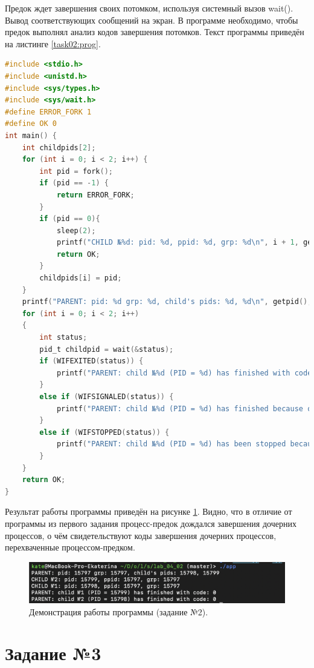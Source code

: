\documentclass[12pt]{report}
\begin{document}
Предок ждет завершения своих потомком, используя системный вызов wait(). Вывод соответствующих сообщений на экран. В программе необходимо, чтобы предок выполнял анализ кодов завершения потомков. Текст программы приведён на листинге \ref{task02:prog}.

\begin{lstlisting}[label=task02:prog,caption=Системный вызов wait(),language=C]
#include <stdio.h>
#include <unistd.h>
#include <sys/types.h>
#include <sys/wait.h>
#define ERROR_FORK 1
#define OK 0
int main() {
    int childpids[2];
    for (int i = 0; i < 2; i++) {
        int pid = fork();
        if (pid == -1) {
            return ERROR_FORK;
        }
        if (pid == 0){
            sleep(2);
            printf("CHILD №%d: pid: %d, ppid: %d, grp: %d\n", i + 1, getpid(), getppid(), getpgrp());
            return OK;
        }
        childpids[i] = pid;
    }
    printf("PARENT: pid: %d grp: %d, child's pids: %d, %d\n", getpid(), getpgrp(), childpids[0], childpids[1]);
    for (int i = 0; i < 2; i++)
    {
        int status;
        pid_t childpid = wait(&status);
        if (WIFEXITED(status)) {
            printf("PARENT: child №%d (PID = %d) has finished with code: %d\n", i + 1, childpid, WEXITSTATUS(status));
        }
        else if (WIFSIGNALED(status)) {
            printf("PARENT: child №%d (PID = %d) has finished because of signal: %d\n", i + 1, childpid, WTERMSIG(status));
        }
        else if (WIFSTOPPED(status)) {
            printf("PARENT: child №%d (PID = %d) has been stopped because of signal: %d\n", i + 1, childpid, WSTOPSIG(status));
        }
    }
    return OK;
}
\end{lstlisting}

Результат работы программы приведён на рисунке \ref{task02:demo}. Видно, что в отличие от программы из первого задания процесс-предок дождался завершения дочерних процессов, о чём свидетельствуют коды завершения дочерних процессов, перехваченные процессом-предком.
\begin{figure}[H]
	\centering
	\includegraphics[width=\linewidth]{task02.png}
	\caption{Демонстрация работы программы (задание №2).}
	\label{task02:demo}
\end{figure}

\newpage
\section*{Задание №3}
\end{document}
